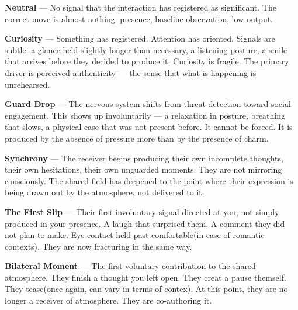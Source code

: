 
\vspace{0.5em}
\textbf{Neutral} --- No signal that the interaction has registered as significant. 
The correct move is almost nothing: presence, baseline observation, low output.

\vspace{0.5em}
\textbf{Curiosity} --- Something has registered. Attention has oriented. 
Signals are subtle: a glance held slightly longer than necessary, a listening posture, 
a smile that arrives before they decided to produce it. Curiosity is fragile. The primary 
driver is perceived authenticity --- the sense that what is happening is unrehearsed.

\vspace{0.5em}
\textbf{Guard Drop} --- The nervous system shifts from threat detection toward 
social engagement. This shows up involuntarily --- a relaxation in posture, 
breathing that slows, a physical ease that was not present before. It cannot be forced. 
It is produced by the absence of pressure more than by the presence of charm.

\vspace{0.5em}
\textbf{Synchrony} --- The receiver begins producing their own incomplete thoughts, their own hesitations, 
their own unguarded moments. They are not mirroring consciously. The shared field has deepened 
to the point where their expression is being drawn out by the atmosphere, not delivered to it.

\vspace{0.5em}
\textbf{The First Slip} --- Their first involuntary signal directed at you, not simply produced 
in your presence. A laugh that surprised them. A comment they did not plan to make. Eye contact 
held past comfortable(in case of romantic contexts). They are now fracturing in the same way.

\vspace{0.5em}
\textbf{Bilateral Moment} --- The first voluntary contribution to the shared atmosphere. 
They finish a thought you left open. They creat a pause themself. They tease(once again, can vary in terms of contex). 
At this point, they are no longer a receiver of atmosphere. They are co-authoring it.
